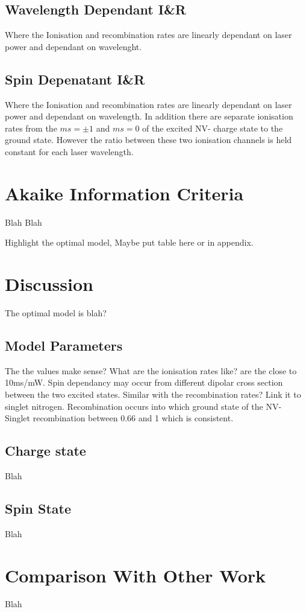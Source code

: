 \documentclass[preprint,prl,twocolumn]{revtex4}
\begin{document}
\subsection{Wavelength Dependant I\&R}
Where the Ionisation and recombination rates are linearly dependant on laser power and dependant on wavelenght.
\subsection{Spin Depenatant I\&R}
Where the Ionisation and recombination rates are linearly dependant on laser power and dependant on wavelength. In addition there are separate ionisation rates from the $ms=\pm1$ and $ms=0$ of the excited NV- charge state to the ground state. However the ratio between these two ionisation channels is held constant for each laser wavelength.


\section{Akaike Information Criteria}
Blah Blah

Highlight the optimal model, Maybe put table here or in appendix.

\section{Discussion}
The optimal model is blah?

\subsection{Model Parameters}
The the values make sense?
What are the ionisation rates like? are the close to 10ms/mW. Spin dependancy may occur from different dipolar cross section between the two excited states.
Similar with the recombination rates? Link it to singlet nitrogen.
Recombination occurs into which ground state of the NV- 
Singlet recombination between 0.66 and 1 which is consistent.


\subsection{Charge state}
Blah
\subsection{Spin State}
Blah

\section{Comparison With Other Work}
Blah
\end{document}
